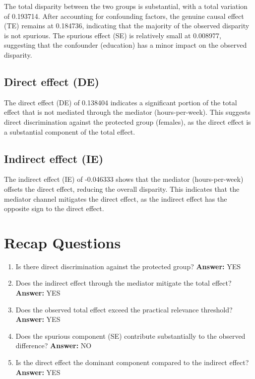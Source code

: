 \documentclass[11pt]{article}
\begin{document}
The total disparity between the two groups is substantial, with a total variation of 0.193714. After accounting for confounding factors, the genuine causal effect (TE) remains at 0.184736, indicating that the majority of the observed disparity is not spurious. The spurious effect (SE) is relatively small at 0.008977, suggesting that the confounder (education) has a minor impact on the observed disparity.

\subsection{Direct effect (DE)}

The direct effect (DE) of 0.138404 indicates a significant portion of the total effect that is not mediated through the mediator (hours-per-week). This suggests direct discrimination against the protected group (females), as the direct effect is a substantial component of the total effect.

\subsection{Indirect effect (IE)}

The indirect effect (IE) of -0.046333 shows that the mediator (hours-per-week) offsets the direct effect, reducing the overall disparity. This indicates that the mediator channel mitigates the direct effect, as the indirect effect has the opposite sign to the direct effect.

\section{Recap Questions}

\begin{enumerate}
\item Is there direct discrimination against the protected group? \textbf{Answer:} YES
\item Does the indirect effect through the mediator mitigate the total effect? \textbf{Answer:} YES
\item Does the observed total effect exceed the practical relevance threshold? \textbf{Answer:} YES
\item Does the spurious component (SE) contribute substantially to the observed difference? \textbf{Answer:} NO
\item Is the direct effect the dominant component compared to the indirect effect? \textbf{Answer:} YES
\end{enumerate}
\end{document}
